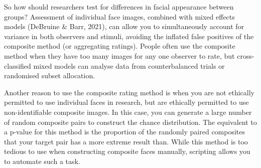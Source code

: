 \documentclass[
  man,floatsintext]{apa6}
\begin{document}
So how should researchers test for differences in facial appearance between groups? Assessment of individual face images, combined with mixed effects models (DeBruine \& Barr, 2021), can allow you to simultaneously account for variance in both observers and stimuli, avoiding the inflated false positives of the composite method (or aggregating ratings). People often use the composite method when they have too many images for any one observer to rate, but cross-classified mixed models can analyse data from counterbalanced trials or randomised subset allocation.

Another reason to use the composite rating method is when you are not ethically permitted to use individual faces in research, but are ethically permitted to use non-identifiable composite images. In this case, you can generate a large number of random composite pairs to construct the chance distribution. The equivalent to a p-value for this method is the proportion of the randomly paired composites that your target pair has a more extreme result than. While this method is too tedious to use when constructing composite faces manually, scripting allows you to automate such a task.
\end{document}
